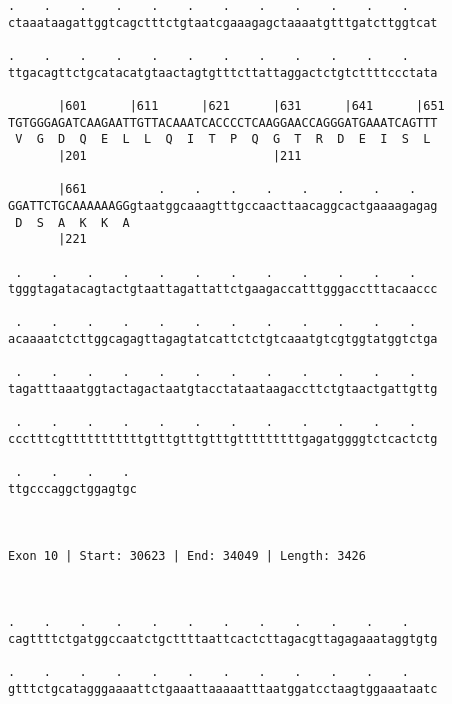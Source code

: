 \documentclass{article}
\begin{document}
\begin{Verbatim}
.    .    .    .    .    .    .    .    .    .    .    .    
ctaaataagattggtcagctttctgtaatcgaaagagctaaaatgtttgatcttggtcat
                                                            
.    .    .    .    .    .    .    .    .    .    .    .    
ttgacagttctgcatacatgtaactagtgtttcttattaggactctgtcttttccctata
                                                            
       |601      |611      |621      |631      |641      |651
TGTGGGAGATCAAGAATTGTTACAAATCACCCCTCAAGGAACCAGGGATGAAATCAGTTT
 V  G  D  Q  E  L  L  Q  I  T  P  Q  G  T  R  D  E  I  S  L 
       |201                          |211                   
  
       |661          .    .    .    .    .    .    .    .   
GGATTCTGCAAAAAAGGgtaatggcaaagtttgccaacttaacaggcactgaaaagagag
 D  S  A  K  K  A                                           
       |221                                                 
  
 .    .    .    .    .    .    .    .    .    .    .    .   
tgggtagatacagtactgtaattagattattctgaagaccatttgggacctttacaaccc
                                                            
 .    .    .    .    .    .    .    .    .    .    .    .   
acaaaatctcttggcagagttagagtatcattctctgtcaaatgtcgtggtatggtctga
                                                            
 .    .    .    .    .    .    .    .    .    .    .    .   
tagatttaaatggtactagactaatgtacctataataagaccttctgtaactgattgttg
                                                            
 .    .    .    .    .    .    .    .    .    .    .    .   
ccctttcgtttttttttttgtttgtttgtttgtttttttttgagatggggtctcactctg
                                                            
 .    .    .    . 
ttgcccaggctggagtgc
                  
                  
 
Exon 10 | Start: 30623 | End: 34049 | Length: 3426



.    .    .    .    .    .    .    .    .    .    .    .    
cagttttctgatggccaatctgcttttaattcactcttagacgttagagaaataggtgtg
                                                            
.    .    .    .    .    .    .    .    .    .    .    .    
gtttctgcatagggaaaattctgaaattaaaaatttaatggatcctaagtggaaataatc
                                                            

\end{Verbatim}
\end{document}
